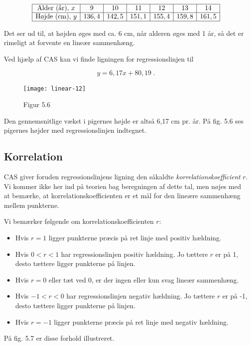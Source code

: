 \documentclass[12pt,oneside,a4paper]{article}
\begin{document}
$$
\begin{array}{|c|c|c|c|c|c|c|}
    \hline
    \mbox{Alder (år)},\, x  & 9  & 10 & 11&  12 & 13 & 14 \\
    \hline
    \mbox{Højde (cm)},\, y  & 136,4 &  142,5 &  151,1 &  155,4 &  159,8 &  161,5 \\
    \hline
\end{array}
$$

Det ser ud til, at højden øges med ca. 6 cm, når alderen øges med 1 år, så det
er rimeligt at forvente en lineær sammenhæng.

Ved hjælp af CAS kan vi finde ligningen for regressionslinjen til

$$
y = 6,17x + 80,19 \; .
$$

\begin{figure}[ht]
    \centering
    \texttt{[image: linear-12]}
    \caption{Figur 5.6}
    \label{fig56}
\end{figure}

Den gennemsnitlige vækst i pigernes højde er altså 6,17 cm pr. år. På fig. 5.6
ses pigernes højder med regressionslinjen indtegnet.

\subsection{Korrelation}
CAS giver foruden regressionslinjens ligning den såkaldte {\em
korrelations\-koef\-fi\-cient} $r$. Vi kommer ikke her ind på teorien bag
beregningen af dette tal, men nøjes med at bemærke, at
korrelationskoefficienten er et mål for den lineære sammenhæng mellem
punkterne.

Vi bemærker følgende om korrelationskoefficienten $r$:

\begin{itemize}
    \item Hvis $r = 1$ ligger punkterne præcis på ret linje med positiv hældning.
    \item Hvis $0 < r < 1$ har regressionslinjen positiv hældning. Jo tættere $r$
        er på 1, desto tættere ligger punkterne på linjen.
    \item Hvis $r = 0$ eller tæt ved 0, er der ingen eller kun svag lineær sammenhæng.
    \item Hvis $-1 < r < 0$ har regressionslinjen negativ hældning. Jo tættere $r$
        er på -1, desto tættere ligger punkterne på linjen.
    \item Hvis $r = -1$ ligger punkterne præcis på ret linje med negativ hældning. 
\end{itemize}
På fig. 5.7 er disse forhold illustreret.
\end{document}
